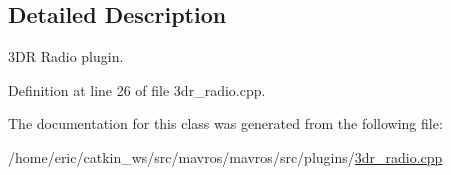\subsection{Detailed Description}
3DR Radio plugin. 

Definition at line 26 of file 3dr\+\_\+radio.\+cpp.



The documentation for this class was generated from the following file\+:\begin{DoxyCompactItemize}
\item 
/home/eric/catkin\+\_\+ws/src/mavros/mavros/src/plugins/\mbox{\hyperlink{3dr__radio_8cpp}{3dr\+\_\+radio.\+cpp}}\end{DoxyCompactItemize}
